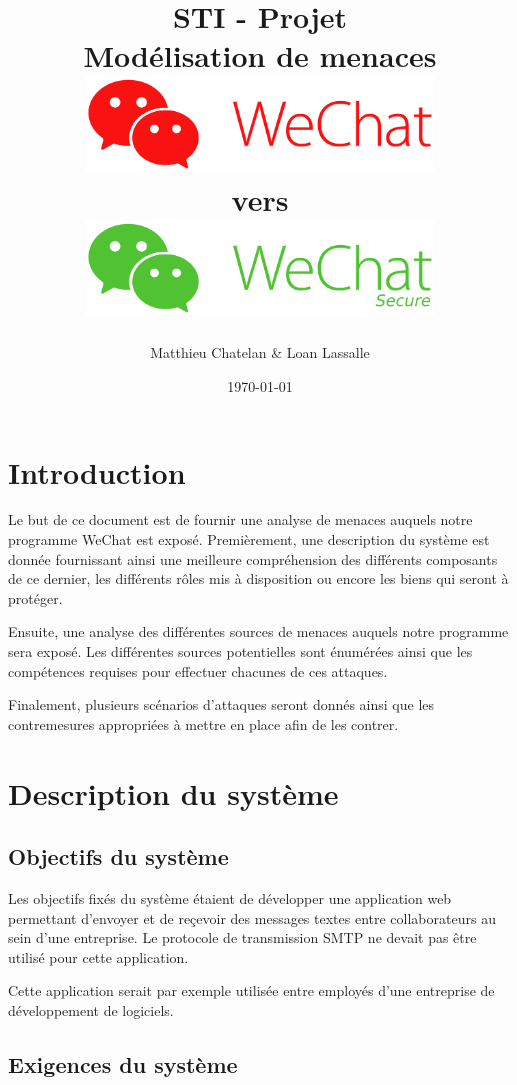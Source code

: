 \documentclass[12pt]{article}
\title
{
  \Huge{STI - Projet}\\
  \vspace{1cm}
  \large{Modélisation de menaces}
  \vspace{2cm} \\
    \includegraphics[width=350px]{wechatinsecure}    
        \vspace{1cm} \\
\large{vers}
  \vspace{1cm} \\
  \includegraphics[width=350px]{wechatsecure}    
  \vspace{6cm} \\
}
\author{Matthieu Chatelan \& Loan Lassalle}
\date{\today}
\begin{document}
\maketitle
\thispagestyle{empty}

\clearpage
\tableofcontents
\listoffigures
\setcounter{page}{1}        %
\clearpage

\section{Introduction}
Le but de ce document est de fournir une analyse de menaces auquels notre programme WeChat est exposé.
Premièrement, une description du système est donnée fournissant ainsi une meilleure compréhension des
différents composants de ce dernier, les différents rôles mis à disposition ou encore les biens 
qui seront à protéger.

Ensuite, une analyse des différentes sources de menaces auquels notre programme sera exposé. Les différentes
sources potentielles sont énumérées ainsi que les compétences requises pour effectuer chacunes de ces attaques.

Finalement, plusieurs scénarios d'attaques seront donnés ainsi que les contremesures appropriées à mettre
en place afin de les contrer.

\section{Description du système}
\subsection{Objectifs du système}

Les objectifs fixés du système étaient de développer une application web permettant d'envoyer  et de reçevoir des messages textes entre collaborateurs au sein d'une entreprise. Le protocole de transmission SMTP ne devait pas être utilisé pour cette application.

Cette application serait par exemple utilisée entre employés d'une entreprise de développement de logiciels.

\subsection{Exigences du système}
\end{document}
